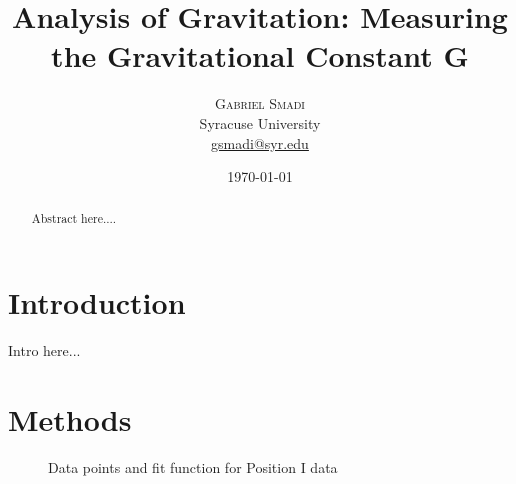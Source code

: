 \documentclass[twoside,twocolumn]{article}
\title{Analysis of Gravitation: Measuring the Gravitational Constant G} %
\author{
\textsc{Gabriel Smadi} \\ %
\normalsize{Syracuse University} \\ %
\normalsize \href{mailto:gsmadi@syr.edu}{gsmadi@syr.edu} %
}
\date{\today} %
\begin{document}
\maketitle

\begin{abstract}
  Abstract here....
\end{abstract}


\section{Introduction}

Intro here...


\section{Methods}

\begin{figure}[H]
\centering
  \begin{center}
  \end{center}
  \caption{Data points and fit function for Position I data}
\end{figure}
\label{fig:apparatus}
\end{document}
